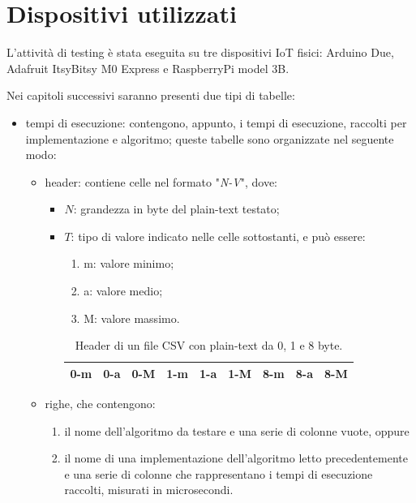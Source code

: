 \documentclass[12pt,a4paper,italian]{report}
\begin{document}
\section{Dispositivi utilizzati}

L'attività di testing è stata eseguita su tre dispositivi IoT fisici: Arduino Due, Adafruit ItsyBitsy M0 Express e RaspberryPi model 3B.

\noindent Nei capitoli successivi saranno presenti due tipi di tabelle:
\begin{itemize}
    \item tempi di esecuzione: contengono, appunto, i tempi di esecuzione, raccolti per implementazione e algoritmo; queste tabelle sono organizzate nel seguente modo:
    \begin{itemize}
        \item header: contiene celle nel formato "\textit{N-V}", dove:
        \begin{itemize}
            \item $N$: grandezza in byte del plain-text testato;
            \item $T$: tipo di valore indicato nelle celle sottostanti, e può essere:
            \begin{enumerate}[label=(\arabic*)]
                \item m: valore minimo;
                \item a: valore medio;
                \item M: valore massimo.
            \end{enumerate}
            \begin{table}[H]
                \centering
            	\begin{tabular}{|c|c|c|c|c|c|c|c|c|}
            		\hline
            		0-m & 0-a & 0-M & 1-m & 1-a & 1-M & 8-m & 8-a & 8-M \\
            		\hline
                \end{tabular}
                \caption{Header di un file CSV con plain-text da 0, 1 e 8 byte.}
            \end{table}
        \end{itemize}
        \item righe, che contengono:
            \begin{enumerate}
                \item il nome dell'algoritmo da testare e una serie di colonne vuote, oppure
                \item il nome di una implementazione dell'algoritmo letto precedentemente e una serie di colonne che rappresentano i tempi di esecuzione raccolti, misurati in microsecondi.

\end{enumerate}
\end{itemize}
\end{itemize}
\end{document}
